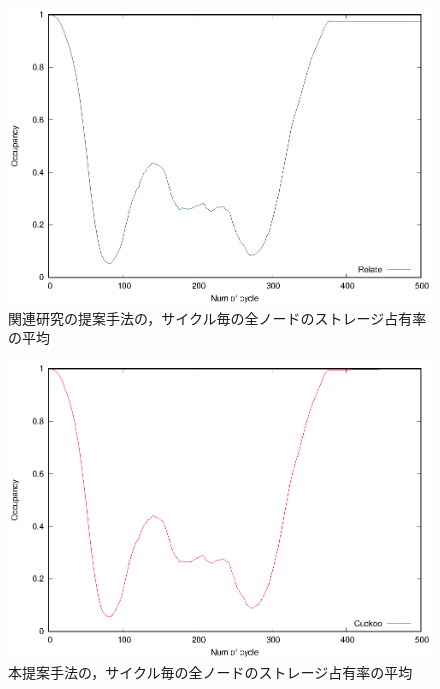 \documentclass[11pt]{jreport}
\begin{document}
\begin{figure}[H]
	\begin{center}
		\includegraphics[width=15.0cm]{./figure/relate_occupancy.eps}
	\end{center}
	\caption{関連研究の提案手法の，サイクル毎の全ノードのストレージ占有率の平均}
	\label{fig:relate_o}
\end{figure}

\begin{figure}[H]
	\begin{center}
		\includegraphics[width=15.0cm]{./figure/cuckoo_occupancy.eps}
	\end{center}
	\caption{本提案手法の，サイクル毎の全ノードのストレージ占有率の平均}
	\label{fig:cuckoo_o}
\end{figure}
\end{document}
